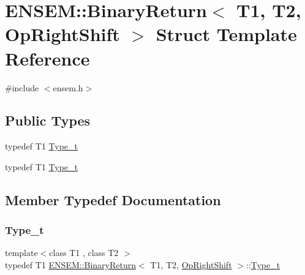 \hypertarget{structENSEM_1_1BinaryReturn_3_01T1_00_01T2_00_01OpRightShift_01_4}{}\section{E\+N\+S\+EM\+:\+:Binary\+Return$<$ T1, T2, Op\+Right\+Shift $>$ Struct Template Reference}
\label{structENSEM_1_1BinaryReturn_3_01T1_00_01T2_00_01OpRightShift_01_4}


{\ttfamily \#include $<$ensem.\+h$>$}

\subsection*{Public Types}
\begin{DoxyCompactItemize}
\item 
typedef T1 \mbox{\hyperlink{structENSEM_1_1BinaryReturn_3_01T1_00_01T2_00_01OpRightShift_01_4_a5376360119f221e4df1236c273764f02}{Type\+\_\+t}}
\item 
typedef T1 \mbox{\hyperlink{structENSEM_1_1BinaryReturn_3_01T1_00_01T2_00_01OpRightShift_01_4_a5376360119f221e4df1236c273764f02}{Type\+\_\+t}}
\end{DoxyCompactItemize}


\subsection{Member Typedef Documentation}
\mbox{\label{structENSEM_1_1BinaryReturn_3_01T1_00_01T2_00_01OpRightShift_01_4_a5376360119f221e4df1236c273764f02}} 
\subsubsection{\texorpdfstring{Type\_t}{Type\_t}\hspace{0.1cm}{\footnotesize\ttfamily [1/2]}}
{\footnotesize\ttfamily template$<$class T1 , class T2 $>$ \\
typedef T1 \mbox{\hyperlink{structENSEM_1_1BinaryReturn}{E\+N\+S\+E\+M\+::\+Binary\+Return}}$<$ T1, T2, \mbox{\hyperlink{structENSEM_1_1OpRightShift}{Op\+Right\+Shift}} $>$\+::\mbox{\hyperlink{structENSEM_1_1BinaryReturn_3_01T1_00_01T2_00_01OpRightShift_01_4_a5376360119f221e4df1236c273764f02}{Type\+\_\+t}}}

